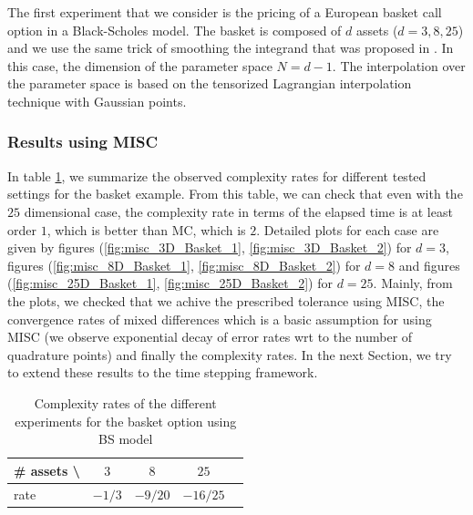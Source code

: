 \documentclass[11pt]{article}
\begin{document}
The first experiment that we consider is the pricing of  a European  basket call option in a Black-Scholes model. The basket is composed of $d$ assets ($d=3,8,25$) and we use the same trick of smoothing the integrand that was proposed in \cite{bayersmoothing}. In this case, the dimension of the parameter space $N=d-1$. The interpolation over the parameter space is based on the tensorized Lagrangian interpolation technique with Gaussian  points.


\subsubsection{Results using MISC}
In table \ref{table: Complexity rates of the different experiemnts  for the basket option using BS model}, we summarize the observed  complexity rates for different tested settings for the basket example. From this table, we can check that even with the $25$ dimensional case, the complexity rate in terms of the elapsed time is at least order $1$, which is better than MC, which is $2$. Detailed plots for each case are given by figures (\ref{fig:misc_3D_Basket_1}, \ref{fig:misc_3D_Basket_2}) for $d=3$, figures (\ref{fig:misc_8D_Basket_1}, \ref{fig:misc_8D_Basket_2}) for $d=8$ and figures (\ref{fig:misc_25D_Basket_1}, \ref{fig:misc_25D_Basket_2}) for $d=25$. Mainly, from the plots, 
we checked  that we achive the prescribed tolerance using MISC, the convergence rates of mixed differences which is a basic assumption for using MISC (we observe exponential decay of error rates wrt to the number of quadrature points) and finally the complexity rates. In the next Section, we try to extend these results to the time stepping framework.


\begin{table}[h!]
	\centering
	\begin{tabular}{l*{3}{c}r}
		\# assets  \textbackslash          & $3$ & $8$ & $25$   \\
		\hline
		rate   & $-1/3$ & $-9/20$ & $-16/25$  \\
		\hline
	\end{tabular}
	\caption{Complexity rates of the different experiments  for the basket option using BS model}
	\label{table: Complexity rates of the different experiemnts  for the basket option using BS model}
\end{table}	
\end{document}
